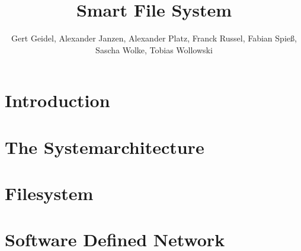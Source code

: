 \documentclass[journal]{IEEEtran}
\begin{document}
\title{Smart File System}



\author{Gert Geidel, Alexander Janzen, Alexander Platz, Franck Russel, Fabian Spie\ss, Sascha Wolke, Tobias Wollowski}


\maketitle





\begin{abstract}




\end{abstract}



\IEEEpeerreviewmaketitle







\section{Introduction}



\section{The Systemarchitecture}







\section{Filesystem}





\section{Software Defined Network}
\label{sec:sdn}

\end{document}
